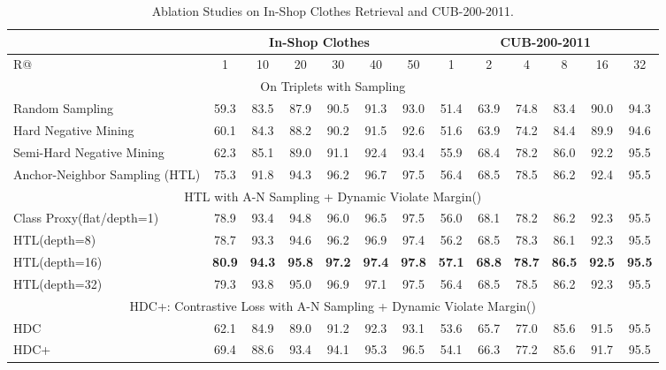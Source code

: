 \documentclass[runningheads]{llncs}
\begin{document}
\begin{table*}[]
\setlength{\abovecaptionskip}{5pt}
\setlength{\belowcaptionskip}{0pt}
\centering
\resizebox{1.0\textwidth}{!}
{
\begin{tabular}{l|cccccc|cccccc}
\hline
\hline
                          & \multicolumn{6}{c|}{In-Shop Clothes}    & \multicolumn{6}{c}{CUB-200-2011}        \\ \hline
R@                        & 1    & 10   & 20   & 30   & 40   & 50   & 1    & 2    & 4    & 8    & 16   & 32   \\ \hline

\hline
\multicolumn{13}{c}{On Triplets with Sampling} \\\hline
Random Sampling& 59.3 & 83.5& 87.9 & 90.5 & 91.3 & 93.0 & 51.4 & 63.9 & 74.8 & 83.4 & 90.0 & 94.3 \\ \hline
Hard Negative Mining      & 60.1 & 84.3 & 88.2 & 90.2 & 91.5 & 92.6 & 51.6 & 63.9 & 74.2 & 84.4 & 89.9 & 94.6 \\ \hline
Semi-Hard Negative Mining                & 62.3 & 85.1 & 89.0 & 91.1 & 92.4 & 93.4 & 55.9 & 68.4 & 78.2 & 86.0 & 92.2 & 95.5 \\ \hline
Anchor-Neighbor Sampling (HTL)              & 75.3 & 91.8 & 94.3 & 96.2 & 96.7 & 97.5 & 56.4 & 68.5 & 78.5 & 86.2 & 92.4 & 95.5 \\ \hline
\hline

\multicolumn{13}{c}{HTL with A-N Sampling + Dynamic Violate Margin()} \\\hline
Class Proxy(flat/depth=1)         & 78.9 & 93.4 & 94.8 & 96.0 & 96.5 & 97.5 & 56.0 & 68.1 & 78.2 & 86.2 & 92.3 & 95.5 \\ \hline

HTL(depth=8)              & 78.7 & 93.3 & 94.6 & 96.2 & 96.9 & 97.4 & 56.2 & 68.5 & 78.3 & 86.1 & 92.3 & 95.5 \\ \hline
HTL(depth=16)             & \textbf{80.9} & \textbf{94.3} & \textbf{95.8} & \textbf{97.2} & \textbf{97.4} & \textbf{97.8} & \textbf{57.1} & \textbf{68.8} & \textbf{78.7} & \textbf{86.5} & \textbf{92.5} & \textbf{95.5} \\ \hline
HTL(depth=32)             & 79.3 & 93.8 & 95.0 & 96.9 & 97.1 & 97.5 & 56.4 & 68.5 & 78.5 & 86.2 & 92.3 & 95.5 \\ \hline
\hline

\multicolumn{13}{c}{HDC+: Contrastive Loss with A-N Sampling + Dynamic Violate Margin()} \\\hline
HDC                       & 62.1 & 84.9 & 89.0 & 91.2 & 92.3 & 93.1 & 53.6 & 65.7 & 77.0 & 85.6 & 91.5 &
95.5 \\ \hline
HDC+                      & 69.4 & 88.6 & 93.4 & 94.1 & 95.3 & 96.5 & 54.1 & 66.3 & 77.2 & 85.6 & 91.7 & 95.5 \\ \hline
 \hline
\end{tabular}
}
\caption{Ablation Studies on In-Shop Clothes Retrieval and CUB-200-2011.}
\label{ablation_study}
\end{table*}
\vspace{-2em}
\end{document}
